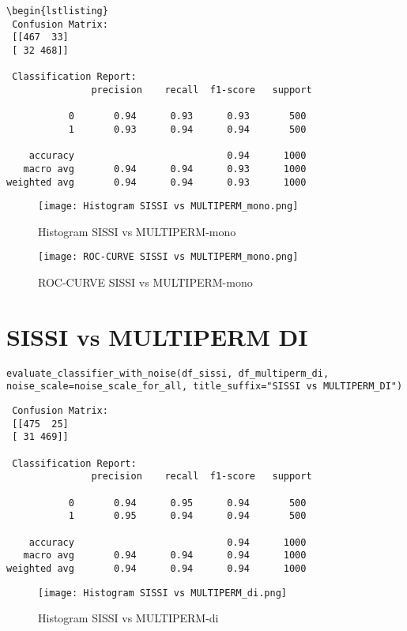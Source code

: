\documentclass{article}
\begin{document}
\begin{large}
\begin{large}
\begin{large}
\begin{lstlisting}
\begin{lstlisting}
 Confusion Matrix:
 [[467  33]
 [ 32 468]]

 Classification Report:
               precision    recall  f1-score   support

           0       0.94      0.93      0.93       500
           1       0.93      0.94      0.94       500

    accuracy                           0.94      1000
   macro avg       0.94      0.94      0.93      1000
weighted avg       0.94      0.94      0.93      1000
\end{lstlisting}\par

\begin{figure}[H]
    \centering
    \texttt{[image: Histogram SISSI vs MULTIPERM\_mono.png]}
    \caption{Histogram SISSI vs MULTIPERM-mono}
\end{figure}

\begin{figure}[H]
    \centering
    \texttt{[image: ROC-CURVE SISSI vs MULTIPERM\_mono.png]}
    \caption{ROC-CURVE SISSI vs MULTIPERM-mono}
\end{figure}

\clearpage

\section{SISSI vs MULTIPERM DI}

\begin{lstlisting}
evaluate_classifier_with_noise(df_sissi, df_multiperm_di, noise_scale=noise_scale_for_all, title_suffix="SISSI vs MULTIPERM_DI")
\end{lstlisting}\par

\begin{lstlisting}
 Confusion Matrix:
 [[475  25]
 [ 31 469]]

 Classification Report:
               precision    recall  f1-score   support

           0       0.94      0.95      0.94       500
           1       0.95      0.94      0.94       500

    accuracy                           0.94      1000
   macro avg       0.94      0.94      0.94      1000
weighted avg       0.94      0.94      0.94      1000
\end{lstlisting}\par

\begin{figure}[H]
    \centering
    \texttt{[image: Histogram SISSI vs MULTIPERM\_di.png]}
    \caption{Histogram SISSI vs MULTIPERM-di}
\end{figure}


\end{large}
\end{large}
\end{large}
\end{document}
